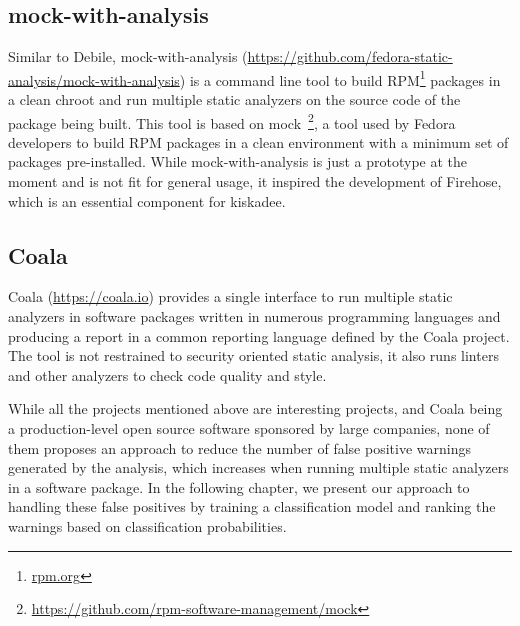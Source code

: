 \subsection{mock-with-analysis}

Similar to Debile, mock-with-analysis
(\url{https://github.com/fedora-static-analysis/mock-with-analysis}) is a
command line tool to build RPM\footnote{\url{rpm.org}} packages in a clean
chroot and run multiple static analyzers on the source code of the package
being built. This tool is based on
mock~\footnote{\url{https://github.com/rpm-software-management/mock}}, a tool
used by Fedora developers to build RPM packages in a clean environment with a
minimum set of packages pre-installed. While mock-with-analysis is just a
prototype at the moment and is not fit for general usage, it inspired the
development of Firehose, which is an essential component for kiskadee.

\subsection{Coala}

Coala (\url{https://coala.io}) provides a single interface to run multiple
static analyzers in software packages written in numerous programming languages
and producing a report in a common reporting language defined by the Coala
project. The tool is not restrained to security oriented static analysis, it
also runs linters and other analyzers to check code quality and style.

While all the projects mentioned above are interesting projects, and Coala
being a production-level open source software sponsored by large companies,
none of them proposes an approach to reduce the number of false positive
warnings generated by the analysis, which increases when running multiple
static analyzers in a software package. In the following chapter, we present
our approach to handling these false positives by training a classification model
and ranking the warnings based on classification probabilities.

